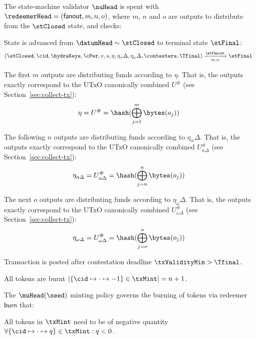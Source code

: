 \noindent The state-machine validator $\nuHead$ is spent with
$\redeemerHead = (\mathsf{fanout}, m, n, o)$, where $m$, $n$ and $o$ are
outputs to distribute from the $\stClosed$ state, and checks:
\begin{menumerate}
  \item State is advanced from $\datumHead \sim \stClosed$ to terminal state
  $\stFinal$: %
  \[
	(\stClosed,\cid,\hydraKeys,\cPer,v, s,\eta,\eta_\alpha\Delta,\eta_\omega\Delta,\contesters,\Tfinal) \xrightarrow[m,n]{\stFanout} \stFinal
  \]
  \item The first $m$ outputs are distributing funds according to $\eta$. That is,
  the outputs exactly correspond to the UTxO canonically combined $U^{\#}$ (see
  Section~\ref{sec:collect-tx}):
  \[
	\eta = U^{\#} = \hash(\bigoplus_{j=1}^{m} \bytes(o_{j}))
  \]
  \item The following $n$ outputs are distributing funds according to
  $\eta_\alpha\Delta$. That is, the outputs exactly correspond to the UTxO canonically
  combined $U^{\#}_{\alpha\Delta}$ (see Section~\ref{sec:collect-tx}):
  \[
	\eta_{\alpha\Delta} = U^{\#}_{\alpha\Delta} = \hash(\bigoplus_{j=n}^{n} \bytes(o_{j}))
  \]
  \item The next $o$ outputs are distributing funds according to
  $\eta_\omega\Delta$. That is, the outputs exactly correspond to the UTxO canonically
  combined $U^{\#}_{\omega\Delta}$ (see Section~\ref{sec:collect-tx}):
  \[
	\eta_{\omega\Delta} = U^{\#}_{\omega\Delta} = \hash(\bigoplus_{j=o}^{o} \bytes(o_{j}))
  \]
  \item Transaction is posted after contestation deadline $\txValidityMin > \Tfinal$.
  \item All tokens are burnt
  $|\{\cid \mapsto \cdot \mapsto -1\} \in \txMint| = n + 1$.
\end{menumerate}

\noindent The $\muHead(\seed)$ minting policy governs the burning of tokens via
redeemer $\mathsf{burn}$ that:
\begin{menumerate}
  \item All tokens in $\txMint$ need to be of negative quantity
  $\forall \{\cid \mapsto \cdot \mapsto q\} \in \txMint : q < 0$.
\end{menumerate}

\FloatBarrier{}

